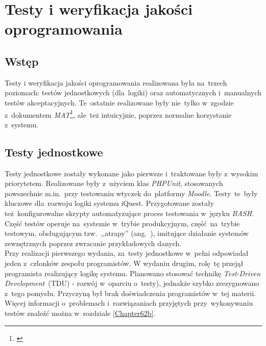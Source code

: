 \chapter{Testy i weryfikacja jakości oprogramowania}
\label{Chapter7}

\section{Wstęp}
\label{Chapter71}

Testy i weryfikacja jakości oprogramowania realizowana była na~trzech poziomach: testów jednostkowych (dla~logiki) oraz automatycznych i~manualnych testów akceptacyjnych. Te~ostatnie realizowane były nie~tylko w~zgodzie z~dokumentem \textit{MAT}\footnote{\cite{Redmine:ProjDocs}}, ale~też intuicyjnie, poprzez normalne korzystanie z~systemu.

\section{Testy jednostkowe}
\label{Chapter72}

Testy jednostkowe zostały wykonane jako pierwsze i~traktowane były z~wysokim priorytetem. Realizowane były z~użyciem klas \textit{PHPUnit}, stosowanych powszechnie m.in.~przy testowaniu wtyczek do~platformy \textit{Moodle}. Testy~te~były kluczowe dla~rozwoju logiki systemu iQuest. Przygotowane zostały też~konfigurowalne skrypty automatyzujące proces testowania w~języku \textit{BASH}. Część testów operuje na~systemie w~trybie produkcyjnym, część~na~trybie testowym, obsługującym tzw.~,,atrapy'' (ang.~), imitujące działanie systemów zewnętrznych poprzez zwracanie przykładowych danych.\\

Przy realizacji pierwszego wydania, za~testy jednostkowe w~pełni odpowiadał jeden z~członków zespołu programistów. W wydaniu drugim, rolę~tę przejął programista realizujący logikę systemu. Planowano stosować technikę \textit{Test-Driven Development}~(TDU) - rozwój w~oparciu o~testy), jednakże szybko zrezygnowano z~tego pomysłu. Przyczyną był brak doświadczenia programistów w~tej materii. Więcej informacji o~problemach i~rozwiązaniach przyjętych przy~wykonywaniu testów znaleźć można w~rozdziale \ref{Chapter62b}.

